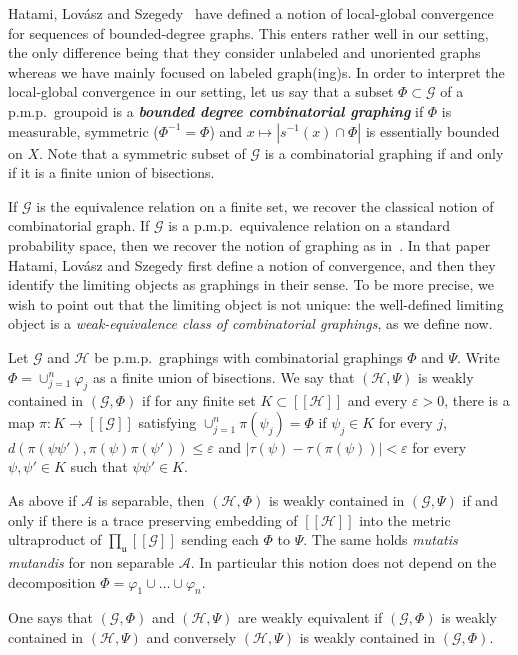 \documentclass[AHL,Unicode,longabstracts,published]{cedram}
\newcommand{\defin}[1]{\textbf{\emph{#1}}}
\newcommand{\cH}{\mathcal{H}}
\newcommand{\ch}{\mathcal{H}}
\newcommand{\cg}{\mathcal{G}}
\newcommand{\ra}{\mathscr{A}}
\newcommand{\ul}{\mathfrak{u}}
\newcommand{\eps}{\varepsilon}
\newcommand{\ph}{\varphi}
\newcommand{\pmp}{p.m.p.\ }
\begin{document}
\begin{rema}\label{rem: local-global cv}
Hatami, Lovász and Szegedy~\cite{HatLovSze} have defined a notion of local-global convergence for sequences of bounded-degree graphs. This enters rather well in our setting, the only difference being that they consider unlabeled and unoriented graphs whereas we have mainly focused on labeled graph(ing)s. In order to interpret the local-global convergence in our setting, let us say that a subset $\Phi \subset \cg$ of a \pmp groupoid is a
\defin{bounded degree combinatorial graphing} if $\Phi$ is measurable, symmetric ($\Phi^{-1} = \Phi$) and $x \mapsto |s^{-1}(x) \cap \Phi|$ is essentially bounded on $X$. Note that a symmetric subset of $\cg$ is a combinatorial graphing if and only if it is a finite union of bisections.

If $\cg$ is the equivalence relation on a finite set, we recover the classical notion of combinatorial graph. If $\cg$ is a \pmp equivalence relation on a standard probability space, then we recover the notion of graphing as in~\cite{Kechris-Miller}. In that paper Hatami, Lovász and Szegedy first define a notion of convergence, and then they identify the limiting objects as graphings in their sense. To be more precise, we wish to point out that the limiting object is not unique: the well-defined limiting object is a \emph{weak-equivalence class of combinatorial graphings}, as we define now.

Let $\cg$ and $\ch$ be \pmp graphings with combinatorial graphings $\Phi$ and $\Psi$. Write $\Phi = \cup_{j=1}^n \ph_j$ as a finite union of bisections. We say that $(\ch,\Psi)$ is weakly contained in $(\cg,\Phi)$ if for any finite set $K \subset [[\cH]]$ and every $\eps>0$, there is a map $\pi \colon K \to [[\cg]]$ satisfying $\cup_{j=1}^n \pi(\psi_j) = \Phi$ if $\psi_j \in K$ for every $j$, $d(\pi(\psi\psi'),\pi(\psi)\pi(\psi')) \leq \eps$ and $|\tau(\psi) - \tau(\pi(\psi))|<\eps$ for every $\psi,\psi' \in K$ such that $\psi\psi' \in K$.

As above if $\ra$ is separable, then $(\ch,\Phi)$ is weakly contained in $(\cg,\Psi)$ if and only if there is a trace preserving embedding of $[[\ch]]$ into the metric ultraproduct of $\prod_\ul [[\cg]]$ sending each $\Phi$ to $\Psi$. The same holds \emph{mutatis mutandis} for non separable $\ra$. In particular this notion does not depend on the decomposition $\Phi = \ph_1\cup\dots\cup \ph_n$.

One says that $(\cg,\Phi)$ and $(\ch,\Psi)$ are weakly equivalent if $(\cg,\Phi)$ is weakly contained in $(\ch,\Psi)$ and conversely $(\ch,\Psi)$ is weakly contained in $(\cg,\Phi)$.


\end{rema}
\end{document}
